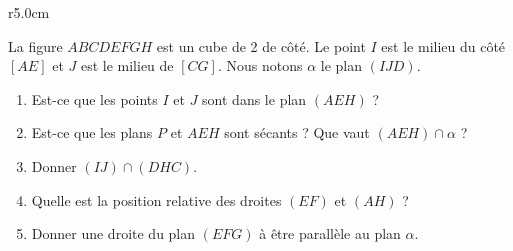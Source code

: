 
\begin{exercice}\label{exosmath-0523}

\begin{wrapfigure}{r}{5.0cm}
   \vspace{-0.5cm}        %
   \centering
   
\end{wrapfigure}
 
La figure \( ABCDEFGH\) est un cube de \unit{2}{\meter} de côté. Le point \( I\) est le milieu du côté \( [AE]\) et \( J\) est le milieu de \( [CG]\). Nous notons \( \alpha\) le plan \( (IJD)\).
\begin{enumerate}
    \item
        Est-ce que les points \( I\) et \( J\) sont dans le plan \( (AEH)\) ?
    \item
        Est-ce que les plans \( P\) et \( AEH\) sont sécants ? Que vaut \(  (AEH)\cap \alpha  \) ?
    \item
        Donner \( (IJ)\cap (DHC)\).
    \item
        Quelle est la position relative des droites \( (EF)\) et \( (AH)\) ?
    \item
        Donner une droite du plan \( (EFG)\) à être parallèle au plan \( \alpha\).
\end{enumerate}

\end{exercice}
